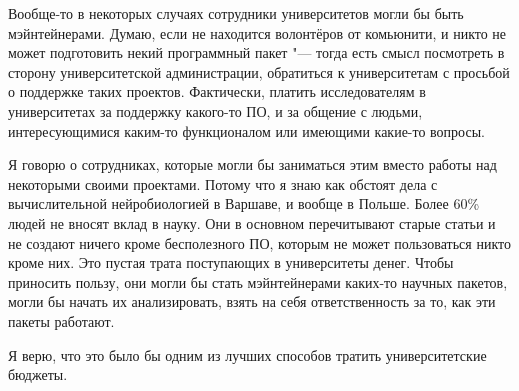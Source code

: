 \documentclass[10pt, a5paper]{article}
\begin{document}
\begin{Parallel}[p]{}{}
{Вообще-то в некоторых случаях сотрудники университетов могли бы быть мэйнтейнерами. Думаю, если не находится волонтёров от комьюнити, и никто не может подготовить некий программный пакет "--- тогда есть смысл посмотреть в сторону университетской администрации, обратиться к университетам с просьбой о поддержке таких проектов. Фактически, платить исследователям в университетах за поддержку какого-то ПО, и за общение с людьми, интересующимися каким-то функционалом или имеющими какие-то вопросы. 

Я говорю о сотрудниках, которые могли бы заниматься этим вместо работы над некоторыми своими проектами. Потому что я знаю как обстоят дела с вычислительной нейробиологией в Варшаве, и вообще в Польше. Более 60\% людей не вносят вклад в науку. Они в основном перечитывают старые статьи и не создают ничего кроме бесполезного ПО, которым не может пользоваться никто кроме них. Это пустая трата поступающих в университеты денег. Чтобы приносить пользу, они могли бы стать мэйнтейнерами каких-то научных пакетов, могли бы начать их анализировать, взять на себя ответственность за то, как эти пакеты работают.

Я верю, что это было бы одним из лучших способов тратить университетские бюджеты. 


     }
   \end{Parallel}









 
\end{document}
